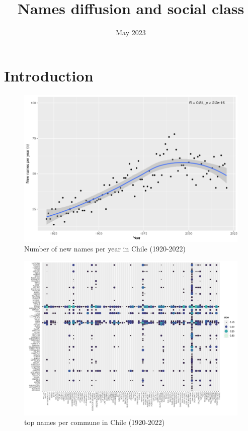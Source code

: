 



\title{Names diffusion and social class}
\author{}
\date{May 2023}



\maketitle

\section{Introduction}


\begin{figure}[H]
    \centering
    \includegraphics[width=13cm]{plot/new_names_year.png}
    \caption{Number of new names per year in Chile (1920-2022)}
    \label{}
\end{figure}


\begin{figure}[H]
    \centering
    \includegraphics[width=13cm]{plot/name_commune.png}
    \caption{top names per commune in Chile (1920-2022)}
    \label{}
\end{figure}


